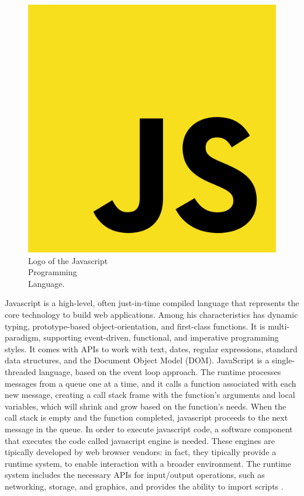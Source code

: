 \begin{figure} %
    \captionsetup{font=footnotesize}
    \centering
    \includegraphics[width=\linewidth]{images/javascript.png}
    \caption{Logo of the Javascript\\Programming\\Language.}
\end{figure}

Javascript is a high-level, often just-in-time compiled language that represents the core technology to build web applications. Among his characteristics has dynamic typing, prototype-based object-orientation, and first-class functions. It is multi-paradigm, supporting event-driven, functional, and imperative programming styles. It comes with APIs to work with text, dates, regular expressions, standard data structures, and the Document Object Model (DOM). JavaScript is a single-threaded language, based on the event loop approach. The runtime processes messages from a queue one at a time, and it calls a function associated with each new message, creating a call stack frame with the function's arguments and local variables, which will shrink and grow based on the function's needs. When the call stack is empty and the function completed, javascript proceeds to the next message in the queue. In order to execute javascript code, a software component that executes the code called javascript engine is needed. These engines are tipically developed by web browser vendors: in fact, they tipically provide a runtime system, to enable interaction with a broader environment. The runtime system includes the necessary APIs for input/output operations, such as networking, storage, and graphics, and provides the ability to import scripts \cite{Javascript}.


